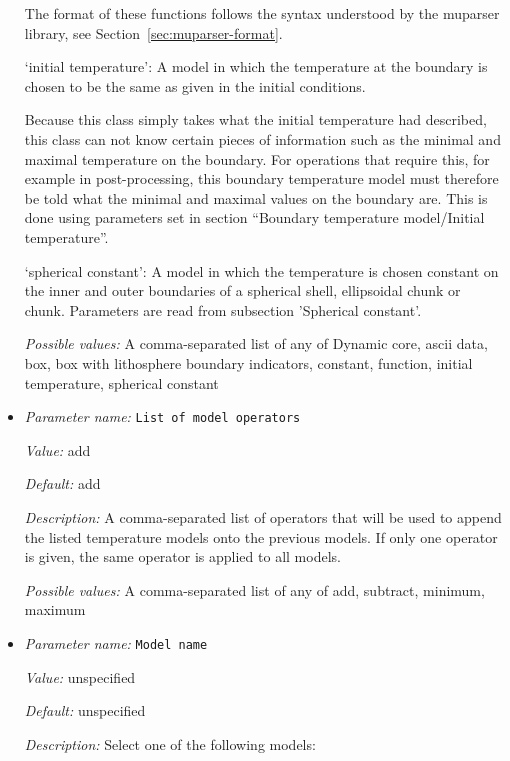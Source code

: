 \begin{itemize}
The format of these functions follows the syntax understood by the muparser library, see Section~\ref{sec:muparser-format}.

`initial temperature': A model in which the temperature at the boundary is chosen to be the same as given in the initial conditions.

Because this class simply takes what the initial temperature had described, this class can not know certain pieces of information such as the minimal and maximal temperature on the boundary. For operations that require this, for example in post-processing, this boundary temperature model must therefore be told what the minimal and maximal values on the boundary are. This is done using parameters set in section ``Boundary temperature model/Initial temperature''.

`spherical constant': A model in which the temperature is chosen constant on the inner and outer boundaries of a spherical shell, ellipsoidal chunk or chunk. Parameters are read from subsection 'Spherical constant'.


{\it Possible values:} A comma-separated list of any of Dynamic core, ascii data, box, box with lithosphere boundary indicators, constant, function, initial temperature, spherical constant
\item {\it Parameter name:} {\tt List of model operators}
\label{parameters:Boundary temperature model/List of model operators}


{\it Value:} add


{\it Default:} add


{\it Description:} A comma-separated list of operators that will be used to append the listed temperature models onto the previous models. If only one operator is given, the same operator is applied to all models.


{\it Possible values:} A comma-separated list of any of add, subtract, minimum, maximum
\item {\it Parameter name:} {\tt Model name}
\label{parameters:Boundary temperature model/Model name}


{\it Value:} unspecified


{\it Default:} unspecified


{\it Description:} Select one of the following models:


\end{itemize}
